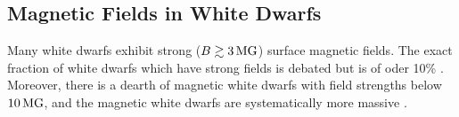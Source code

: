 \subsection{Magnetic Fields in White Dwarfs}

Many white dwarfs exhibit strong ($B \gtrsim 3 \, {\rm MG}$) surface magnetic fields. The exact fraction of white dwarfs which have strong fields is debated but is of oder 10\% \citep{Hollands_2015}. Moreover, there is a dearth of magnetic white dwarfs with field strengths below $10 \, {\rm MG}$, and the magnetic white dwarfs are systematically more massive \citep{Ferrario_2015B}.




\cite{Ferrario_2015A}
  
  